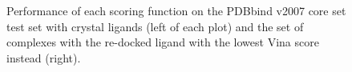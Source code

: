 \begin{figure}
\centering
{}
\caption{Performance of each scoring function on the PDBbind v2007 core set test set with crystal ligands (left of each plot) and the set of complexes with the re-docked ligand with the lowest Vina score instead (right).}
\label{rfscore4:set-1-pdbbind-2007-trn-1}
\end{figure}

